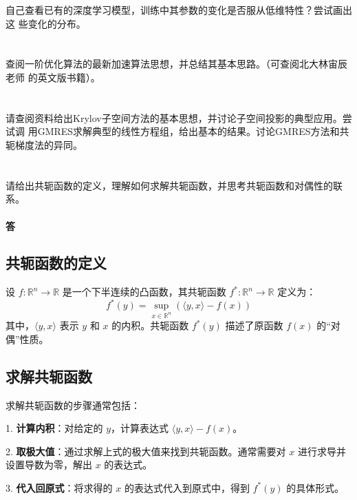 \documentclass[a4paper]{article}
\begin{document}
自己查看已有的深度学习模型，训练中其参数的变化是否服从低维特性？尝试画出这
些变化的分布。

\section{}

查阅一阶优化算法的最新加速算法思想，并总结其基本思路。（可查阅北大林宙辰老师
的英文版书籍）。

\section{}

请查阅资料给出Krylov子空间方法的基本思想，并讨论子空间投影的典型应用。尝试调
用GMRES求解典型的线性方程组，给出基本的结果。讨论GMRES方法和共轭梯度法的异同。

\section{}

请给出共轭函数的定义，理解如何求解共轭函数，并思考共轭函数和对偶性的联系。

\paragraph{答}

\subsection{共轭函数的定义}

设 $f: \mathbb{R}^n \to \mathbb{R}$ 是一个下半连续的凸函数，其共轭函数 $f^*: \mathbb{R}^n \to \mathbb{R}$ 定义为：
\[
f^*(y) = \sup_{x \in \mathbb{R}^n} \left( \langle y, x \rangle - f(x) \right)
\]
其中，$\langle y, x \rangle$ 表示 $y$ 和 $x$ 的内积。共轭函数 $f^*(y)$ 描述了原函数 $f(x)$ 的“对偶”性质。

\subsection{求解共轭函数}

求解共轭函数的步骤通常包括：

1. \textbf{计算内积}：对给定的 $y$，计算表达式 $ \langle y, x \rangle - f(x) $。

2. \textbf{取极大值}：通过求解上式的极大值来找到共轭函数。通常需要对 $x$ 进行求导并设置导数为零，解出 $x$ 的表达式。

3. \textbf{代入回原式}：将求得的 $x$ 的表达式代入到原式中，得到 $f^*(y)$ 的具体形式。
\end{document}
